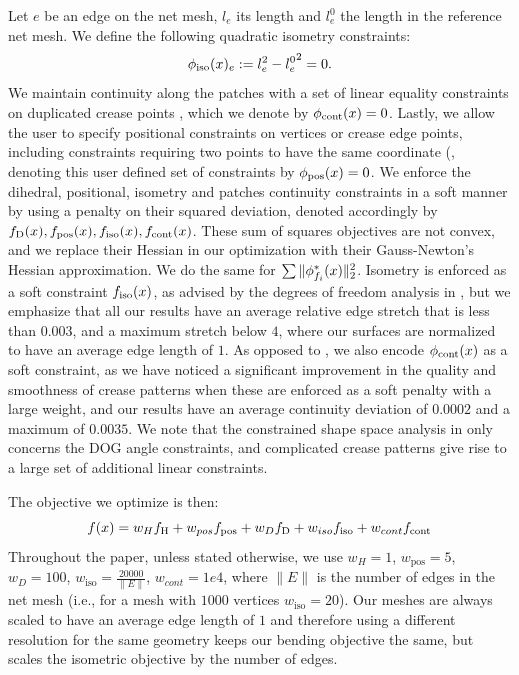 Let $e$ be an edge on the net mesh, $l_e$ its length and $l_e^0$ the length in the reference net mesh. We define the following quadratic isometry constraints:
\begin{equation}
\phi_\text{iso}(x)_e := l_e^2 - {l_e^0}^2 = 0.
\end{equation}
We maintain continuity along the patches with a set of linear equality constraints on duplicated crease points \cite{rabi2018shape}, which we denote by $\phi_\text{cont}(x) = 0$. Lastly, we allow the user to specify positional constraints on vertices or crease edge points, including constraints requiring two points to have the same coordinate (, denoting this user defined set of constraints by $\phi_{\text{pos}}(x) = 0$.
We enforce the dihedral, positional, isometry and patches continuity constraints in a soft manner by using a penalty on their squared deviation, denoted accordingly by $f_\text{D}(x), f_\text{pos}(x), f_\text{iso}(x), f_\text{cont}(x)$. These sum of squares objectives are not convex, and we replace their Hessian in our optimization with their Gauss-Newton's Hessian approximation. We do the same for $\sum \|\phi^*_{f_i}(x)\|_2^2$. Isometry is enforced as a soft constraint $f_\text{iso}(x)$, as advised by the degrees of freedom analysis in \cite{rabi18,rabi2018shape}, but we emphasize that all our results have an average relative edge stretch that is less than $0.003$, and a maximum stretch below $4$, where our surfaces are normalized to have an average edge length of $1$. As opposed to \cite{rabi2018shape}, we also encode  $\phi_\text{cont}(x)$  as a soft constraint, as we have noticed a significant improvement in the quality and smoothness of crease patterns when these are enforced as a soft penalty with a large weight,
and our results have an average continuity deviation of $0.0002$ and a maximum of $0.0035$. We note that the constrained shape space analysis in \cite{rabi2018shape} only concerns the DOG angle constraints, and complicated crease patterns give rise to a large set of additional linear constraints.
 
The objective we optimize is then:
\begin{equation} \label{eq:opt}
f(x) = w_Hf_\text{H}+w_{pos}f_\text{pos}+w_Df_\text{D}+w_{iso}f_\text{iso}+w_{cont}f_\text{cont}
\end{equation}
Throughout the paper, unless stated otherwise, we use $w_H = 1$, $w_\text{pos}=5$,$w_D = 100$, $w_\text{iso}= \frac{20000}{\|E\|}$, $w_{cont} = 1e4$, where $\|E\|$ is the number of edges in the net mesh (i.e., for a mesh with $1000$ vertices $w_\text{iso}=20$). Our meshes are always scaled to have an average edge length of $1$ and therefore using a different resolution for the same geometry keeps our bending objective the same, but scales the isometric objective by the number of edges.